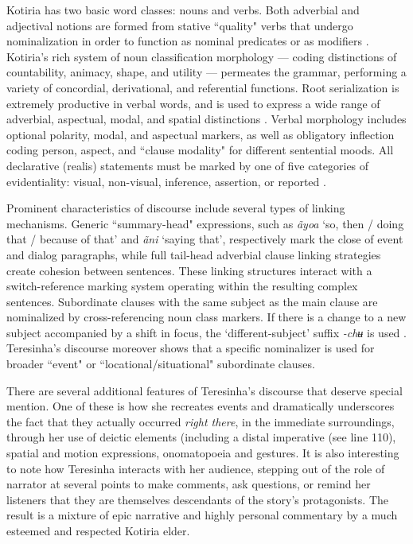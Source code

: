 \documentclass[output=paper,
modfonts,nonflat
]{langsci/langscibook}
\begin{document}
Kotiria has two basic word classes: nouns and verbs. Both adverbial and adjectival notions are formed from stative “quality" verbs that undergo nominalization in order to function as nominal predicates or as modifiers \parencite{Stenzelforthcoming}. Kotiria’s rich system of noun classification morphology — coding distinctions of countability, animacy, shape, and utility — permeates the grammar, performing a variety of concordial, derivational, and referential functions. Root serialization is extremely productive in verbal words, and is used to express a wide range of adverbial, aspectual, modal, and spatial distinctions \parencite{Stenzel2007a}. Verbal morphology includes optional polarity, modal, and aspectual markers, as well as obligatory inflection coding person, aspect, and “clause modality" for different sentential moods. All declarative (realis) statements must be marked by one of five categories of evidentiality: visual, non-visual, inference, assertion, or reported \parencite{Stenzel2008a,StenzelGomez2018}. 

Prominent characteristics of discourse include several types of linking mechanisms. Generic “summary-head" expressions, such as \textit{ãyoa} ‘so, then / doing that / because of that’ and \textit{ãni} ‘saying that’, respectively mark the close of event and dialog paragraphs, while full tail-head adverbial clause linking strategies create cohesion between sentences. These linking structures interact with a switch-reference marking system operating within the resulting complex sentences. Subordinate clauses with the same subject as the main clause are nominalized by cross-referencing noun class markers. If there is a change to a new subject accompanied by a shift in focus, the ‘different-subject’ suffix \textit{-chʉ} is used \parencite{Stenzel2015, Stenzel2016}. Teresinha’s discourse moreover shows that a specific nominalizer is used for broader “event" or “locational/situational" subordinate clauses.

There are several additional features of Teresinha’s discourse that deserve special mention. One of these is how she recreates events and dramatically underscores the fact that they actually occurred \textit{right there}, in the immediate surroundings, through her use of deictic elements (including a distal imperative (see line 110), spatial and motion expressions, onomatopoeia and gestures. It is also interesting to note how Teresinha interacts with her audience, stepping out of the role of narrator at several points to make comments, ask questions, or remind her listeners that they are themselves descendants of the story’s protagonists. The result is a mixture of epic narrative and highly personal commentary by a much esteemed and respected Kotiria elder. 
\end{document}
